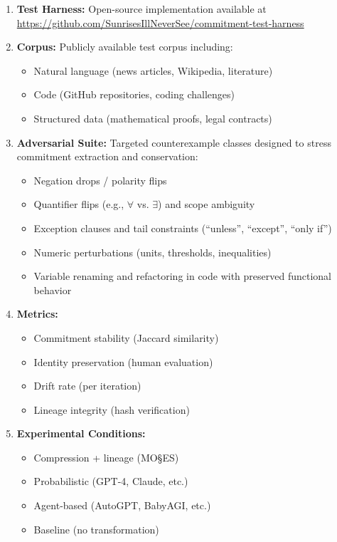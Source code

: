 \documentclass[11pt,a4paper]{article}
\begin{document}
\begin{enumerate}
    \item \textbf{Test Harness:} Open-source implementation available at\\
    \url{https://github.com/SunrisesIllNeverSee/commitment-test-harness}

    \item \textbf{Corpus:} Publicly available test corpus including:
    \begin{itemize}
        \item Natural language (news articles, Wikipedia, literature)
        \item Code (GitHub repositories, coding challenges)
        \item Structured data (mathematical proofs, legal contracts)
    \end{itemize}

    \item \textbf{Adversarial Suite:} Targeted counterexample classes designed to stress commitment extraction and conservation:
    \begin{itemize}
        \item Negation drops / polarity flips
        \item Quantifier flips (e.g., $\forall$ vs. $\exists$) and scope ambiguity
        \item Exception clauses and tail constraints (``unless'', ``except'', ``only if'')
        \item Numeric perturbations (units, thresholds, inequalities)
        \item Variable renaming and refactoring in code with preserved functional behavior
    \end{itemize}

    \item \textbf{Metrics:}
    \begin{itemize}
        \item Commitment stability (Jaccard similarity)
        \item Identity preservation (human evaluation)
        \item Drift rate (per iteration)
        \item Lineage integrity (hash verification)
    \end{itemize}

    \item \textbf{Experimental Conditions:}
    \begin{itemize}
        \item Compression + lineage (MO\S{}ES\texttrademark{})
        \item Probabilistic (GPT-4, Claude, etc.)
        \item Agent-based (AutoGPT, BabyAGI, etc.)
        \item Baseline (no transformation)
    \end{itemize}


\end{enumerate}
\end{document}
